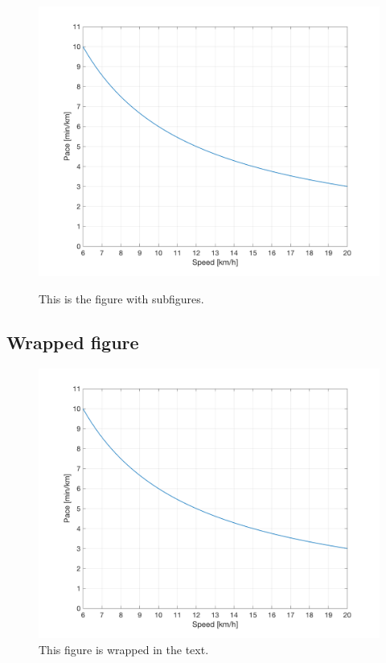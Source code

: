 \begin{figure}[H]
\begin{minipage}[b]{.5\linewidth}
	\label{fig:1a}
  \end{minipage}%
  \begin{minipage}[b]{.5\linewidth}
    \centering
	\includegraphics[width=0.8\linewidth]{Figures/PacevsSpeed.png}
	\label{fig:1b}
  \end{minipage}
  \caption{This is the figure with subfigures.}
  \label{fig:1}
\end{figure}

\subsection{Wrapped figure}

\begin{figure}
	\includegraphics[width=\linewidth]{Figures/PacevsSpeed.png}
	\caption{This figure is wrapped in the text.}
	\label{Fig:}
\end{figure}

\lipsum[1-2]
